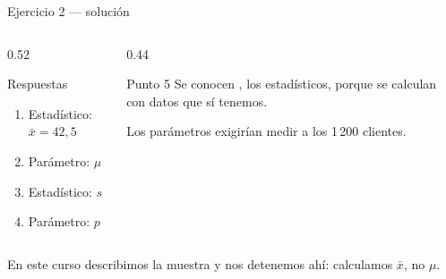 \documentclass[aspectratio=169,10pt]{beamer}
\begin{document}
\begin{frame}{Ejercicio 2 — solución}
  \begin{columns}[T,onlytextwidth]
    \begin{column}{0.52\textwidth}
      \begin{block}{Respuestas}
        \footnotesize
        \begin{enumerate}
          \item Estadístico: $\bar{x}=42{,}5$
          \item Parámetro: $\mu$
          \item Estadístico: $s$
          \item Parámetro: $p$
        \end{enumerate}
      \end{block}
    \end{column}
    \begin{column}{0.44\textwidth}
      \begin{exampleblock}{Punto 5}
        \footnotesize
        Se conocen , los estadísticos, porque se calculan con datos
        que sí tenemos.

        \vspace{0.15cm}
        Los parámetros exigirían medir a los 1\,200 clientes.
      \end{exampleblock}
    \end{column}
  \end{columns}

  \vspace{0.2cm}
  {\footnotesize\color{uniGris} En este curso describimos la muestra y nos
  detenemos ahí: calculamos $\bar{x}$, no $\mu$. }
\end{frame}
\end{document}
